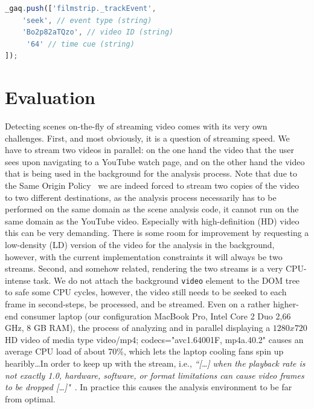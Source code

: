 \documentclass[10pt,twocolumn,letterpaper]{article}
\begin{document}
\begin{lstlisting}[caption=JavaScript hot spot event tracking code snippet. The \texttt{\_gaq} object refers to the Analytics event tracking queue., label=code:event, float=t, frame=single, language=JavaScript]
_gaq.push(['filmstrip._trackEvent', 
    'seek', // event type (string)
    'Bo2p82aTQzo', // video ID (string)
     '64' // time cue (string)
]);
\end{lstlisting} 

\section{Evaluation} \label{sec:evaluation}
Detecting scenes on-the-fly of streaming video comes with its very own challenges. First, and most obviously, it is a question of streaming speed. We have to stream two videos in parallel: on the one hand the video that the user sees upon navigating to a YouTube watch page, and on the other hand the video that is being used in the background for the analysis process. Note that due to the Same Origin Policy~\cite{sameoriginpolicy} we are indeed forced to stream two copies of the video to two different destinations, as the analysis process necessarily has to be performed on the same domain as the scene analysis code, it cannot run on the same domain as the YouTube video. Especially with high-definition (HD) video this can be very demanding. There is some room for improvement by requesting a low-density (LD) version of the video for the analysis in the background, however, with the current implementation constraints it will always be two streams. Second, and somehow related, rendering the two streams is a very CPU-intense task. We do not attach the background \texttt{video} element to the DOM tree to safe some CPU cycles, however, the video still needs to be seeked to each frame in second-steps, be processed, and be streamed. Even on a rather higher-end consumer laptop (our configuration MacBook Pro, Intel Core 2 Duo 2,66 GHz, 8 GB RAM), the process of analyzing and in parallel displaying a $1280x720$ HD video of media type video/mp4; codecs="avc1.64001F, mp4a.40.2" causes an average CPU load of about 70\%, which lets the laptop cooling fans spin up hearibly\ldots In order to keep up with the stream, i.e., \textit{``[\ldots] when the playback rate is not exactly 1.0, hardware, software, or format limitations can cause video frames to be dropped [\ldots]"}~\cite{whatwgvideo}. In practice this causes the analysis environment to be far from optimal.
\end{document}
